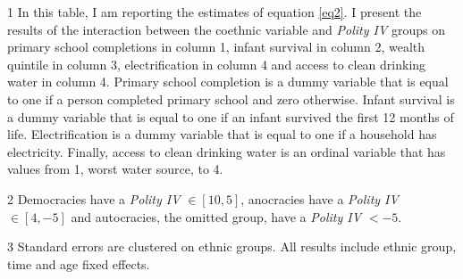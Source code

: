 \begin{table}[htbp]
\begin{adjustbox}{max width=\textwidth}
\begin{threeparttable}[t]
\begin{footnotesize}
\begin{tablenotes}
     \item[1] In this table, I am reporting the estimates of equation \ref{eq2}. I present the results of the interaction between the coethnic variable and \textit{Polity IV } groups on primary school completions in column 1, infant survival in column 2, wealth quintile in column 3, electrification in column 4 and access to clean drinking water in column 4. Primary school completion is a dummy variable that is equal to one if a person completed primary school and zero otherwise. Infant survival is a dummy variable that is equal to one if an infant survived the first 12 months of life. Electrification is a dummy variable that is equal to one if a household has electricity. Finally, access to clean drinking water is an ordinal variable that has values from 1, worst water source, to 4.
     \item[2] Democracies have a \textit{Polity IV } $\in [10, 5]$, anocracies have a \textit{Polity IV } $\in [4, -5]$ and autocracies, the omitted group, have a \textit{Polity IV } $<-5$.
     \item[3] Standard errors are clustered on ethnic groups. All results include ethnic group, time and age fixed effects.
   \end{tablenotes}
   \end{footnotesize}
    \end{threeparttable}%
\label{tab:ethdem}
\end{adjustbox}
\end{table}

